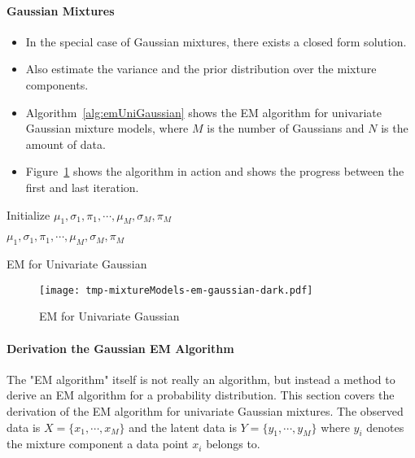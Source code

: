 				\paragraph{Gaussian Mixtures}
					\begin{itemize}
						\item In the special case of Gaussian mixtures, there exists a closed form solution.
						\item Also estimate the variance and the prior distribution over the mixture components.
						\item Algorithm~\ref{alg:emUniGaussian} shows the EM algorithm for univariate Gaussian mixture models, where \(M\) is the number of Gaussians and \(N\) is the amount of data.
						\item Figure~\ref{fig:emUniGaussian} shows the algorithm in action and shows the progress between the first and last iteration.
					\end{itemize}

					\begin{algorithm}
						Initialize \( \mu_1, \sigma_1, \pi_1, \cdots, \mu_M, \sigma_M, \pi_M \)


						\Return \( \mu_1, \sigma_1, \pi_1, \cdots, \mu_M, \sigma_M, \pi_M \)

						\caption{EM for Univariate Gaussian}
						\label{alg:emUniGaussian}
					\end{algorithm}

					\begin{figure}
						\centering
						\texttt{[image: tmp-mixtureModels-em-gaussian-dark.pdf]}
						\caption{EM for Univariate Gaussian}
						\label{fig:emUniGaussian}
					\end{figure}

				\paragraph{Derivation the Gaussian EM Algorithm}
					The "EM algorithm" itself is not really an algorithm, but instead a method to derive an EM algorithm for a probability distribution. This section covers the derivation of the EM algorithm for univariate Gaussian mixtures. The observed data is \( X = \{ x_1, \cdots, x_M \} \) and the latent data is \( Y = \{ y_1, \cdots, y_M \} \) where \(y_i\) denotes the mixture component a data point \(x_i\) belongs to.

